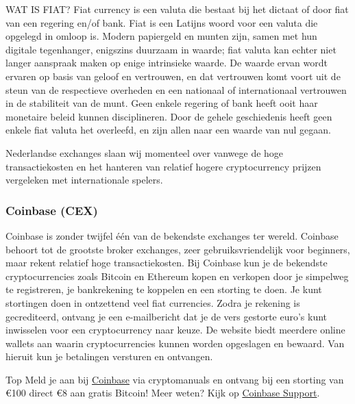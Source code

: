\bigskip
\begin{cryptobox}{WAT IS FIAT?}
        Fiat currency is een valuta die bestaat bij het dictaat of door fiat van een regering en/of bank. Fiat is een Latijns woord voor een valuta die opgelegd in omloop is. 
        Modern papiergeld en munten zijn, samen met hun digitale tegenhanger, enigszins duurzaam in waarde; fiat valuta  kan echter niet langer aanspraak maken op enige intrinsieke waarde. De waarde ervan wordt ervaren op basis van geloof en vertrouwen, en dat vertrouwen komt voort uit de steun van de respectieve overheden en een nationaal of internationaal vertrouwen in de stabiliteit van de munt. Geen enkele regering of bank heeft ooit haar monetaire beleid kunnen disciplineren. Door de gehele geschiedenis heeft geen enkele fiat valuta het overleefd, en zijn allen naar een waarde van nul gegaan. %
\end{cryptobox}
\bigskip

Nederlandse exchanges slaan wij momenteel over vanwege de hoge transactiekosten en het hanteren van relatief hogere cryptocurrency prijzen vergeleken met internationale spelers.


\subsubsection*{Coinbase (CEX)}
Coinbase is zonder twijfel {\'e}{\'e}n van de bekendste exchanges ter wereld. Coinbase behoort tot de grootste broker exchanges, zeer gebruiksvriendelijk voor beginners, maar rekent relatief hoge transactiekosten. Bij Coinbase kun je de bekendste cryptocurrencies zoals Bitcoin en Ethereum kopen en verkopen door je simpelweg te registreren, je bankrekening te koppelen en een storting te doen. Je kunt stortingen doen in ontzettend veel fiat currencies. Zodra je rekening is gecrediteerd, ontvang je een e-mailbericht dat je de vers gestorte euro's kunt inwisselen voor een cryptocurrency naar keuze. De website biedt meerdere online wallets aan waarin cryptocurrencies kunnen worden opgeslagen en bewaard. Van hieruit kun je betalingen versturen en ontvangen.\medskip

\begin{topbox}{Top}
Meld je aan bij \href{https://www.coinbase.com/join/51954a2b26a1bcc484000015}{Coinbase} via {\selectfont cryptomanuals} en ontvang bij een storting van \euro 100 direct \euro 8 aan gratis Bitcoin!
\tcblower
Meer weten? Kijk op \href{https://support.coinbase.com/}{Coinbase Support}.
\end{topbox}

